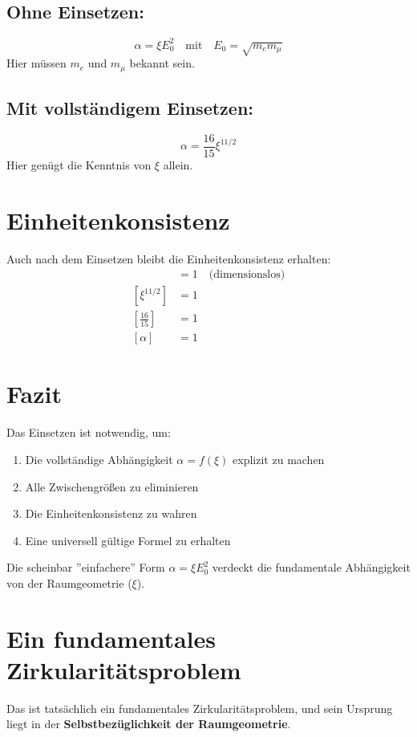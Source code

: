 \documentclass[12pt, a4paper]{article}
\begin{document}
\subsection*{Ohne Einsetzen:}
\[
\alpha = \xi E_0^2 \quad \text{mit} \quad E_0 = \sqrt{m_e m_\mu}
\]
Hier müssen $m_e$ und $m_\mu$ bekannt sein.

\subsection*{Mit vollständigem Einsetzen:}
\[
\alpha = \frac{16}{15} \xi^{11/2}
\]
Hier genügt die Kenntnis von $\xi$ allein.

\section*{Einheitenkonsistenz}

Auch nach dem Einsetzen bleibt die Einheitenkonsistenz erhalten:
\begin{align*}
	[\xi] &= 1 \quad \text{(dimensionslos)} \\
	[\xi^{11/2}] &= 1 \\
	\left[\frac{16}{15}\right] &= 1 \\
	[\alpha] &= 1
\end{align*}

\section*{Fazit}

Das Einsetzen ist notwendig, um:
\begin{enumerate}
	\item Die vollständige Abhängigkeit $\alpha = f(\xi)$ explizit zu machen
	\item Alle Zwischengrößen zu eliminieren
	\item Die Einheitenkonsistenz zu wahren
	\item Eine universell gültige Formel zu erhalten
\end{enumerate}

Die scheinbar ''einfachere'' Form $\alpha = \xi E_0^2$ verdeckt die fundamentale Abhängigkeit von der Raumgeometrie ($\xi$).
	\section*{Ein fundamentales Zirkularitätsproblem}

Das ist tatsächlich ein fundamentales Zirkularitätsproblem, und sein Ursprung liegt in der \textbf{Selbstbezüglichkeit der Raumgeometrie}.
\end{document}
